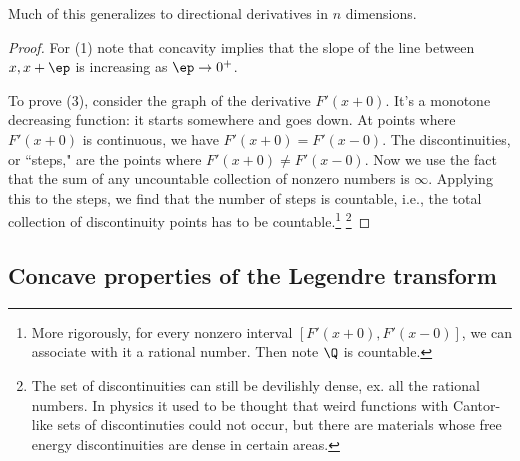 Much of this generalizes to directional derivatives in $n$ dimensions.
\begin{proof}
For (1) note that concavity implies that the slope of the line between $x,x+\ep$ is increasing as $\ep\to 0^+$.


To prove (3), consider the graph of the derivative $F'(x + 0)$. It's a monotone decreasing function: it starts somewhere and goes down. 
At points where $F'(x+0)$ is continuous, we have $F'(x+0)=F'(x-0)$. The discontinuities, or ``steps," are the points where $F'(x+0)\ne F'(x-0)$. Now we use the fact that the sum of any uncountable collection of nonzero numbers is $\infty$. 
Applying this to the steps, we find that the number of steps is countable, i.e., the total collection of discontinuity points has to be countable.\footnote{More rigorously, for every nonzero interval $[F'(x+0),F'(x-0)]$, we can associate with it a rational number. Then note $\Q$ is countable.}
\footnote{The set of discontinuities can still be devilishly dense, ex. all the rational numbers. In physics it used to be thought that weird functions with Cantor-like sets of discontinuties could not occur, but there are materials whose free energy discontinuities are dense in certain areas.}

\end{proof}

\subsection{Concave properties of the Legendre transform}

